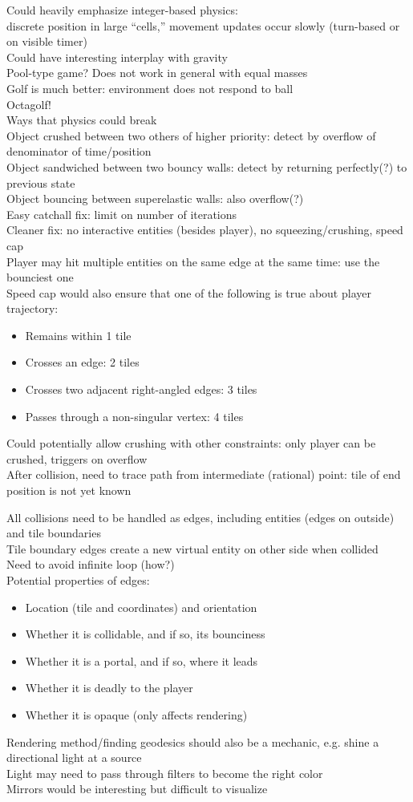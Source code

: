 \documentclass{article}
\begin{document}
Could heavily emphasize integer-based physics: \\
discrete position in large ``cells,''
movement updates occur slowly (turn-based or on visible timer) \\
Could have interesting interplay with gravity \\
Pool-type game? Does not work in general with equal masses \\
Golf is much better: environment does not respond to ball \\
Octagolf! \\

Ways that physics could break \\
Object crushed between two others of higher priority:
detect by overflow of denominator of time/position \\
Object sandwiched between two bouncy walls:
detect by returning perfectly(?) to previous state \\
Object bouncing between superelastic walls: also overflow(?) \\
Easy catchall fix: limit on number of iterations \\
Cleaner fix: no interactive entities (besides player),
no squeezing/crushing, speed cap \\
Player may hit multiple entities on the same edge at the same time:
use the bounciest one \\
Speed cap would also ensure that one of the following is true
about player trajectory:
\begin{itemize}
\item
  Remains within 1 tile
\item
  Crosses an edge: 2 tiles
\item
  Crosses two adjacent right-angled edges: 3 tiles
\item
  Passes through a non-singular vertex: 4 tiles
\end{itemize}
Could potentially allow crushing with other constraints:
only player can be crushed, triggers on overflow \\
After collision, need to trace path from intermediate (rational) point:
tile of end position is not yet known

All collisions need to be handled as edges,
including entities (edges on outside) and tile boundaries \\
Tile boundary edges create a new virtual entity on other side when collided \\
Need to avoid infinite loop (how?) \\
Potential properties of edges:
\begin{itemize}
\item
  Location (tile and coordinates) and orientation
\item
  Whether it is collidable, and if so, its bounciness
\item
  Whether it is a portal, and if so, where it leads
\item
  Whether it is deadly to the player
\item
  Whether it is opaque (only affects rendering)
\end{itemize}

Rendering method/finding geodesics should also be a mechanic,
e.g. shine a directional light at a source \\
Light may need to pass through filters to become the right color \\
Mirrors would be interesting but difficult to visualize \\
\end{document}
